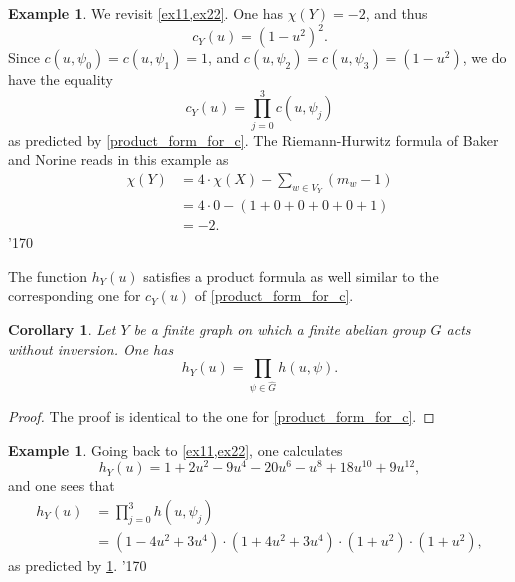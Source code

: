 \documentclass[11pt]{amsart}
\newtheorem{corollary}[theorem]{Corollary}
\numberwithin{equation}{section}
\theoremstyle{remark}
\theoremstyle{definition}
\newtheorem{example}[theorem]{Example}
\newcommand\xqed[1]{%
  \leavevmode\unskip\penalty9999 \hbox{}\nobreak\hfill
  \quad\hbox{#1}}
\newcommand\demo{\xqed{\manual\char'170}}
\begin{document}
\begin{example}
We revisit \cref{ex11,ex22}.  One has $\chi(Y) = -2$, and thus
$$c_{Y}(u) = (1-u^{2})^{2}. $$
Since $c(u,\psi_{0}) = c(u,\psi_{1}) = 1$, and $c(u,\psi_{2}) = c(u,\psi_{3}) = (1-u^{2})$, we do have the equality
$$c_{Y}(u) = \prod_{j=0}^{3}c(u,\psi_{j}) $$
as predicted by \cref{product_form_for_c}.  The Riemann-Hurwitz formula of Baker and Norine reads in this example as
\begin{equation*}
\begin{aligned}
\chi(Y) &= 4 \cdot \chi(X) - \sum_{w \in V_{Y}}(m_{w} - 1) \\
&= 4 \cdot 0 - (1 + 0 + 0  + 0+ 0+ 1) \\
&= -2.
\end{aligned}
\end{equation*}
\demo
\end{example}

The function $h_{Y}(u)$ satisfies a product formula as well similar to the corresponding one for $c_{Y}(u)$ of \cref{product_form_for_c}. 
\begin{corollary} \label{prod_formula_th}
Let $Y$ be a finite graph on which a finite abelian group $G$ acts without inversion.  One has
\begin{equation} \label{prod_formula}
h_{Y}(u) = \prod_{\psi \in \widehat{G}} h(u,\psi).
\end{equation}
\end{corollary}
\begin{proof}
The proof is identical to the one for \cref{product_form_for_c}.
\end{proof}

\begin{example}
Going back to \cref{ex11,ex22}, one calculates
$$h_{Y}(u) = 1  + 2u^{2} - 9u^{4} - 20u^{6} - u^{8} + 18u^{10} + 9u^{12}, $$
and one sees that
\begin{equation*}
\begin{aligned}
h_{Y}(u) &= \prod_{j=0}^{3}h(u,\psi_{j}) \\
&= (1-4u^{2} + 3u^{4}) \cdot (1+4u^{2} + 3u^{4})  \cdot (1 + u^{2}) \cdot (1+u^{2}), 
\end{aligned}
\end{equation*}
as predicted by \cref{prod_formula_th}.
\demo
\end{example} 
\end{document}
